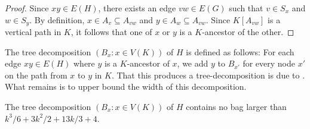 \documentclass{patmorin}
\newcommand{\bagsize}{\ensuremath{k^3/6 + 3k^2/2 + 13k/3 + 4}}
\begin{document}
 \begin{proof}
   Since $xy\in E(H)$, there exists an edge $vw\in E(G)$ such that $v\in S_x$ and $w\in S_y$.  By definition, $x\in A_v\subseteq A_{vw}$ and $y\in A_w\subseteq A_{vw}$.  Since $K[A_{vw}]$ is a vertical path in $K$, it follows that one of $x$ or $y$ is a $K$-ancestor of the other. 
\end{proof}

The tree decomposition $(B_x:x\in V(K))$ of $H$ is defined as follows: For each edge $xy\in E(H)$ where $y$ is a $K$-ancestor of $x$, we add $y$ to $B_{x'}$ for every node $x'$ on the path from $x$ to $y$ in $K$.  That this produces a tree-decomposition is due to .  What remains is to upper bound the width of this decomposition.

\begin{clm}
  The tree decomposition $(B_x: x\in V(K))$ of $H$ contains no bag larger than $\bagsize$.
\end{clm}
\end{document}

